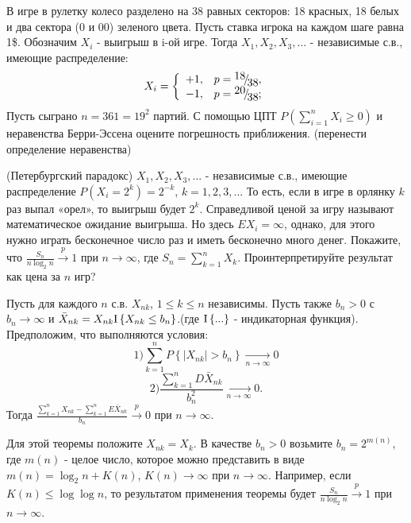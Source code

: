 \begin{problem}
В игре в рулетку колесо разделено на 38 равных секторов: 18 красных, 18 белых и два сектора (0 и 00) зеленого цвета. Пусть ставка игрока на каждом шаге равна 1\$. Обозначим $X_{i} $ - выигрыш в i-ой игре. Тогда $X_{1} ,X_{2} ,X_{3} ,...$ - независимые с.в., имеющие распределение: 
\[X_{i} =\left\{\begin{array}{cc} {+1,} & {p={\raise0.7ex\hbox{$ 18 $}\!\mathord{\left/ {\vphantom {18 38}} \right. \kern-\nulldelimiterspace}\!\lower0.7ex\hbox{$ 38 $}} ,} \\ {-1,} & {p={\raise0.7ex\hbox{$ 20 $}\!\mathord{\left/ {\vphantom {20 38}} \right. \kern-\nulldelimiterspace}\!\lower0.7ex\hbox{$ 38 $}} ;} \end{array}\right. \] 
Пусть сыграно $n=361=19^{2} $ партий. С помощью ЦПТ $P\left(\sum _{i=1}^{n}X_{i}  \ge 0\right)$ и  неравенства Берри-Эссена оцените погрешность приближения. (перенести определение неравенства)
\end{problem}

\begin{problem}
(Петербургский парадокс) $X_{1} ,X_{2} ,X_{3} ,...$ - независимые с.в., имеющие распределение $P\left(X_{i} =2^{k} \right)=2^{-k} $, $k=1,2,3,...$ То есть, если в игре в орлянку $k$ раз выпал «орел», то выигрыш будет $2^{k} $. Справедливой ценой за игру называют математическое ожидание выигрыша. Но здесь $EX_{i} =\infty $, однако, для этого нужно играть бесконечное число раз и иметь бесконечно много денег. Покажите, что $\frac{S_{n} }{n\log _{2} n} \mathop{\to }\limits^{p} 1$ при $n\to \infty $, где $S_{n} =\sum _{k=1}^{n}X_{k}  $. Проинтерпретируйте результат как цена за $n$ игр?

\begin{ordre} 

Пусть для каждого $n$ с.в. $X_{nk} $, $1\le k\le n$ независимы. Пусть также $b_{n} >0$ с $b_{n} \to \infty $ и $\bar{X}_{nk} =X_{nk} {\rm I} \left\{X_{nk} \le b_{n} \right\}$.(где ${\rm I} \left\{...\right\}$ - индикаторная функция). Предположим, что выполняются условия:
\[1) \sum _{k=1}^{n}P\left\{\left|X_{nk} \right|>b_{n} \right\} \mathop{\to }\limits_{n\to \infty } 0\] 
\[2) \frac{\sum _{k=1}^{n}D\bar{X}_{nk}  }{b_{n} ^{2} } \mathop{\to }\limits_{n\to \infty } 0.\] 
Тогда $\frac{\sum _{k=1}^{n}X_{nk}  -\sum _{k=1}^{n}E\bar{X}_{nk}  }{b_{n} } \mathop{\to }\limits^{p} 0$ при $n\to \infty $.

\noindent Для этой теоремы положите $X_{nk} =X_{k} $. В качестве $b_{n} >0$ возьмите $b_{n} =2^{m(n)} $, где $m(n)$ - целое число, которое можно представить в виде $m(n)=\log _{2} n+K(n)$, $K(n)\to \infty $ при $n\to \infty $. Например, если $K(n)\le \log \log n$, то результатом применения теоремы будет $\frac{S_{n} }{n\log _{2} n} \mathop{\to }\limits^{p} 1$ при $n\to \infty $.

\end{ordre} 

\end{problem}

